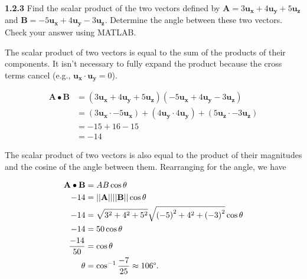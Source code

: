 \documentclass{article}
\begin{document}
\textbf{1.2.3} Find the scalar product of the two vectors defined by $\mathbf{A} = 3\mathbf{u_x} + 4\mathbf{u_y} +
	5\mathbf{u_z}$ and $\mathbf{B} = -5\mathbf{u_x} + 4\mathbf{u_y} - 3\mathbf{u_z}$. Determine the angle between these
two vectors. Check your answer using MATLAB\@.

\vspace{24pt}

The scalar product of two vectors is equal to the sum of the products of their components. It isn't necessary to fully
expand the product because the cross terms cancel (e.g., $\mathbf{u_x} \cdot \mathbf{u_y} = 0$).

\begin{equation*}
	\begin{split}
		\mathbf{A} \bullet \mathbf{B} & = (3\mathbf{u_x} + 4\mathbf{u_y} + 5\mathbf{u_z})(-5\mathbf{u_x} + 4\mathbf{u_y} -
		3\mathbf{u_z}) \\
		& = (3\mathbf{u_x} \cdot -5\mathbf{u_x}) + (4\mathbf{u_y} \cdot 4\mathbf{u_y}) + (5\mathbf{u_z} \cdot
		-3\mathbf{u_z}) \\
		& = -15 + 16 - 15 \\
		& = -14
	\end{split}
\end{equation*}

The scalar product of two vectors is also equal to the product of their magnitudes and the cosine of the angle between
them. Rearranging for the angle, we have

\begin{equation*}
	\begin{split}
		\mathbf{A} \bullet \mathbf{B} & = AB\cos{\theta} \\
		-14 & = ||\mathbf{A}||||\mathbf{B}||\cos{\theta} \\
		-14 & = \sqrt{3^2 + 4^2 + 5^2}\sqrt{{(-5)}^2 + 4^2 + {(-3)}^2}\cos{\theta} \\
		-14 & = 50\cos{\theta} \\
		\frac{-14}{50} & = \cos{\theta} \\
		\theta & = \cos^{-1}{\frac{-7}{25}} \approx 106\degree.
	\end{split}
\end{equation*}
\end{document}
